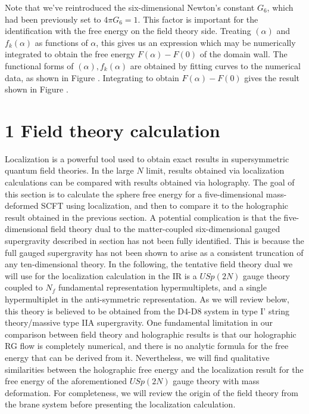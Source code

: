 \documentclass{article}
\begin{document}
Note that we've reintroduced the six-dimensional Newton's constant \(G_{6}\), which had been previously set to \(4 \pi G_{6}=1\). This factor is important for the identification with the free energy on the field theory side. Treating \((\alpha)\) and \(f_{k}(\alpha)\) as functions of \(\alpha\), this gives us an expression which may be numerically integrated to obtain the free energy \(F(\alpha)-F(0)\) of the domain wall. The functional forms of \((\alpha), f_{k}(\alpha)\) are obtained by fitting curves to the numerical data, as shown in Figure . Integrating to obtain \(F(\alpha)-F(0)\) gives the result shown in Figure .
\section*{1 Field theory calculation}
Localization is a powerful tool used to obtain exact results in supersymmetric quantum field theories. In the large \(N\) limit, results obtained via localization calculations can be compared with results obtained via holography. The goal of this section is to calculate the sphere free energy for a five-dimensional mass-deformed SCFT using localization, and then to compare it to the holographic result obtained in the previous section. A potential complication is that the five-dimensional field theory dual to the matter-coupled six-dimensional gauged supergravity described in section has not been fully identified. This is because the full gauged supergravity has not been shown to arise as a consistent truncation of any ten-dimensional theory. In the following, the tentative field theory dual we will use for the localization calculation in the IR is a \(U S p(2 N)\) gauge theory coupled to \(N_{f}\) fundamental representation hypermultiplets, and a single hypermultiplet in the anti-symmetric representation. As we will review below, this theory is believed to be obtained from the D4-D8 system in type I' string theory/massive type IIA supergravity. One fundamental limitation in our comparison between field theory and holographic results is that our holographic RG flow is completely numerical, and there is no analytic formula for the free energy that can be derived from it. Nevertheless, we will find qualitative similarities between the holographic free energy and the localization result for the free energy of the aforementioned \(U S p(2 N)\) gauge theory with mass deformation. For completeness, we will review the origin of the field theory from the brane system before presenting the localization calculation.
\end{document}

